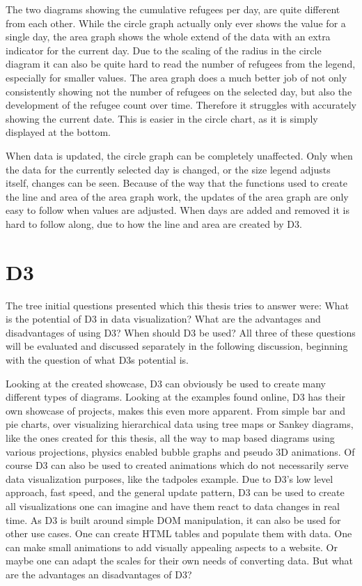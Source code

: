 The two diagrams showing the cumulative refugees per day, are quite different from each other. While the circle graph actually only ever shows the value for a single day, the area graph shows the whole extend of the data with an extra indicator for the current day.
Due to the scaling of the radius in the circle diagram it can also be quite hard to read the number of refugees from the legend, especially for smaller values.
The area graph does a much better job of not only consistently showing not the number of refugees on the selected day, but also the development of the refugee count over time. Therefore it struggles with accurately showing the current date. This is easier in the circle chart, as it is simply displayed at the bottom.

When data is updated, the circle graph can be completely unaffected. Only when the data for the currently selected day is changed, or the size legend adjusts itself, changes can be seen. Because of the way that the functions used to create the line and area of the area graph work, the updates of the area graph are only easy to follow when values are adjusted. When days are added and removed it is hard to follow along, due to how the line and area are created by D3.


\section{D3}\label{sec:d3-dis}
The tree initial questions presented which this thesis tries to answer were: What is the potential of D3 in data visualization? What are the advantages and disadvantages of using D3? When should D3 be used? All three of these questions will be evaluated and discussed separately in the following discussion, beginning with the question of what D3s potential is. 

Looking at the created showcase, D3 can obviously be used to create many different types of diagrams. Looking at the examples found online, D3 has their own showcase of projects, makes this even more apparent. From simple bar and pie charts, over visualizing hierarchical data using tree maps or Sankey diagrams, like the ones created for this thesis, all the way to map based diagrams using various projections\cite{davies}, physics enabled bubble graphs\cite{carter_2012} and pseudo 3D animations\cite{davies_sphere}. Of course D3 can also be used to created animations which do not necessarily serve data visualization purposes, like the tadpoles example\cite{bostock_2020}. Due to D3's low level approach, fast speed, and the general update pattern, D3 can be used to create all visualizations one can imagine and have them react to data changes in real time. As D3 is built around simple DOM manipulation, it can also be used for other use cases. One can create HTML tables and populate them with data. One can make small animations to add visually appealing aspects to a website. Or maybe one can adapt the scales for their own needs of converting data. But what are the advantages an disadvantages of D3?

